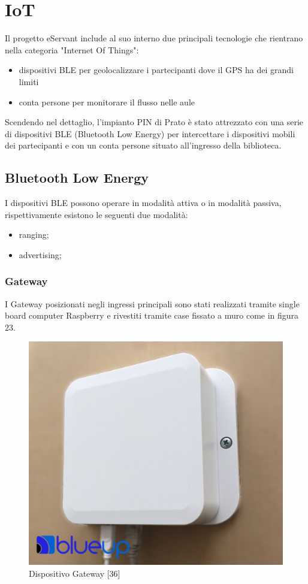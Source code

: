 \chapter{IoT}
Il progetto eServant include al suo interno due principali tecnologie che rientrano nella categoria
"Internet Of Things":
\begin{itemize}
    \item dispositivi BLE per geolocalizzare i partecipanti dove il GPS ha dei grandi limiti
    \item conta persone per monitorare il flusso nelle aule
\end{itemize}


Scendendo nel dettaglio, l'impianto PIN di Prato è stato attrezzato con una serie di dispositivi BLE 
(Bluetooth Low Energy) per intercettare i dispositivi mobili dei partecipanti e con un conta persone
situato all'ingresso della biblioteca.

\section{Bluetooth Low Energy}
I dispositivi BLE possono operare in modalità attiva o in modalità passiva, rispettivamente esistono
le seguenti due modalità:
\begin{itemize}
    \item ranging;
    \item advertising;
\end{itemize}


\subsection{Gateway}
I Gateway posizionati negli ingressi principali sono stati realizzati tramite single board computer 
Raspberry e rivestiti tramite case fissato a muro come in figura 23.
\begin{figure}[H]
    \caption{Dispositivo Gateway [36]}
    \centering  
    \includegraphics[scale=0.4]{img/cap4/gateway}
\end{figure}

